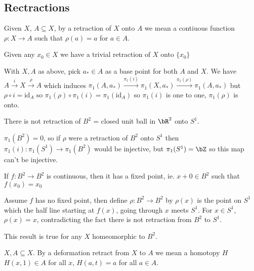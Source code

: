 
\subsection{Rectractions}

\begin{definition}
    Given $X$, $A \subseteq X$, by a retraction of $X$ onto $A$ we mean a contiuous function $\rho: X \to A$ such that $\rho(a) = a$ for $a \in A$. 
\end{definition}

\noindent
Given any $x_0 \in X$ we have a trivial retraction of $X$ onto $\{x_0\}$

\begin{proposition}
    With $X,A$ as above, pick $a_* \in A$ as a base point for both $A$ and $X$. We have $A \stackrel{i}{\to} X \stackrel{\rho}{\to}A$ which induces $\pi_1(A, a_*) \stackrel{\pi_1(i)}{\to} \pi_1(X, a_*) \stackrel{\pi_1(\rho)}{\to} \pi_1(A, a_*)$ but $\rho \circ i = \text{id}_A$ so $\pi_1(\rho) \circ \pi_1(i) = \pi_1(\text{id}_A)$ so $\pi_1(i)$ is one to one, $\pi_1(\rho)$ is onto. 
\end{proposition}

\begin{proposition}
    There is not retraction of $B^2$ = closed unit ball in $\bR^2$ onto $S^1$. 
\end{proposition}

\begin{pf}
    $\pi_1(B^2)=0$, so if $\rho$ were a retraction of $B^2$ onto $S^1$ then $\pi_1(i): \pi_1(S^1) \to \pi_1(B^2)$ would be injective, but $\pi_1(S^1) =\bZ$ so this map can't be injective. 
\end{pf}

\begin{theorem}
    If $f: B^2 \to B^2$ is continuous, then it has a fixed point, ie. $x+0 \in B^2$ such that $f(x_0)=x_0$
\end{theorem}

\begin{pf}
    Assume $f$ has no fixed point, then define $\rho: B^2 \to B^2$ by $\rho(x)$ is the point on $S^1$ which the half line starting at $f(x)$, going through $x$ meets $S^1$. For $x \in S^1$, $\rho(x)=x$, contradicting the fact there is not retraction from $B^2$ to $S^1$. 
\end{pf}

\noindent
This result is true for any $X$ homeomorphic to $B^2$. 

\begin{definition}
    $X, A \subseteq X$. By a deformation retract from $X$ to $A$ we mean a homotopy $H$ $H(x,1) \in A$ for all $x$, $H(a,t) = a$ for all $a \in A$. 
\end{definition}


